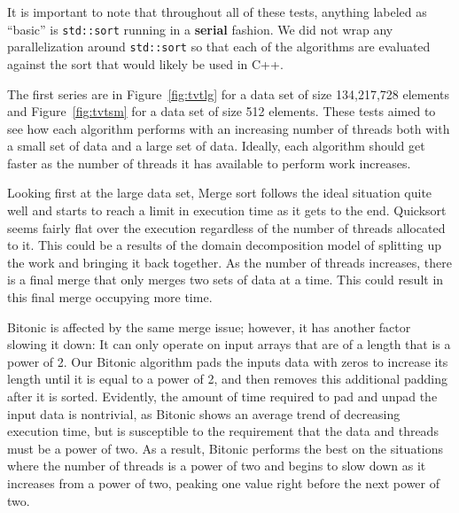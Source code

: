\documentclass[journal]{IEEEtran}
\begin{document}
It is important to note that throughout all of these tests, anything labeled as ``basic'' is \texttt{std::sort} running in a \textbf{serial} fashion. We did not wrap any parallelization around \texttt{std::sort} so that each of the algorithms are evaluated against the sort that would likely be used in C++.

The first series are in Figure~\ref{fig:tvtlg} for a data set of size 134,217,728 elements and Figure~\ref{fig:tvtsm} for a data set of size 512 elements. These tests aimed to see how each algorithm performs with an increasing number of threads both with a small set of data and a large set of data. Ideally, each algorithm should get faster as the number of threads it has available to perform work increases.

Looking first at the large data set, Merge sort follows the ideal situation quite well and starts to reach a limit in execution time as it gets to the end. Quicksort seems fairly flat over the execution regardless of the number of threads allocated to it. This could be a results of the domain decomposition model of splitting up the work and bringing it back together. As the number of threads increases, there is a final merge that only merges two sets of data at a time. This could result in this final merge occupying more time. 

Bitonic is affected by the same merge issue; however, it has another factor slowing it down:  It can only operate on input arrays that are of a length that is a power of 2.  Our Bitonic algorithm pads the inputs data with zeros to increase its length until it is equal to a power of 2, and then removes this additional padding after it is sorted.  Evidently, the amount of time required to pad and unpad the input data is nontrivial, as Bitonic shows an average trend of decreasing execution time, but is susceptible to the requirement that the data and threads must be a power of two. As a result, Bitonic performs the best on the situations where the number of threads is a power of two and begins to slow down as it increases from a power of two, peaking one value right before the next power of two.  
\end{document}
